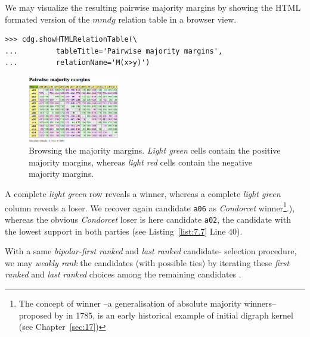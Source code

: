 We may visualize the resulting pairwise majority margins by showing the HTML formated version of the $mmdg$ relation table in a browser view.
\begin{lstlisting}
>>> cdg.showHTMLRelationTable(\
...         tableTitle='Pairwise majority margins',
...         relationName='M(x>y)')
\end{lstlisting}
\begin{figure}[h]
\sidecaption[t]
\includegraphics[width=4cm]{Figures/7-4-majorityMargins.png}
\caption{Browsing the majority margins. \emph{Light green} cells contain the positive majority margins, whereas \emph{light red} cells contain the negative majority margins.}
\label{fig:7.4}       %
\end{figure}

A complete \emph{light green} row reveals a \Condorcet winner, whereas a complete \emph{light green} column reveals a \Condorcet loser. We recover again candidate \texttt{a06} as \emph{Condorcet} winner\footnote{The concept of \Condorcet winner --a generalisation of absolute majority winners-- proposed by \Condorcet in 1785, is an early historical example of initial digraph kernel (see Chapter~\vref{sec:17})}.), whereas the obvious \emph{Condorcet} loser is here candidate \texttt{a02}, the candidate with the lowest support in both parties (see Listing~\vref{list:7.7} Line 40).

With a same \emph{bipolar-first ranked} and \emph{last ranked} candidate- selection procedure, we may \emph{weakly rank} the candidates (with possible ties) by iterating these \emph{first ranked} and \emph{last ranked} choices among the remaining candidates \citep{BIS-1999}.

